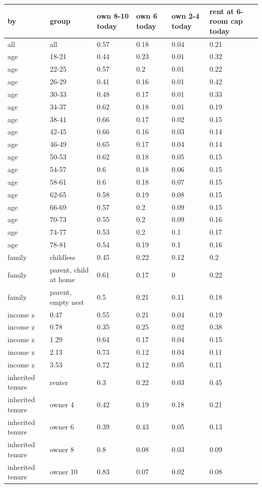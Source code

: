 \begingroup\small
\setlength{\tabcolsep}{3pt}
\renewcommand{\arraystretch}{1.04}
\begin{tabularx}{\linewidth}{XXXXXX}
\toprule
by & group & own 8-10 today & own 6 today & own 2-4 today & rent at 6-room cap today \\
\midrule
all & all & 0.57 & 0.18 & 0.04 & 0.21 \\
age & 18-21 & 0.44 & 0.23 & 0.01 & 0.32 \\
age & 22-25 & 0.57 & 0.2 & 0.01 & 0.22 \\
age & 26-29 & 0.41 & 0.16 & 0.01 & 0.42 \\
age & 30-33 & 0.48 & 0.17 & 0.01 & 0.33 \\
age & 34-37 & 0.62 & 0.18 & 0.01 & 0.19 \\
age & 38-41 & 0.66 & 0.17 & 0.02 & 0.15 \\
age & 42-45 & 0.66 & 0.16 & 0.03 & 0.14 \\
age & 46-49 & 0.65 & 0.17 & 0.04 & 0.14 \\
age & 50-53 & 0.62 & 0.18 & 0.05 & 0.15 \\
age & 54-57 & 0.6 & 0.18 & 0.06 & 0.15 \\
age & 58-61 & 0.6 & 0.18 & 0.07 & 0.15 \\
age & 62-65 & 0.58 & 0.19 & 0.08 & 0.15 \\
age & 66-69 & 0.57 & 0.2 & 0.09 & 0.15 \\
age & 70-73 & 0.55 & 0.2 & 0.09 & 0.16 \\
age & 74-77 & 0.53 & 0.2 & 0.1 & 0.17 \\
age & 78-81 & 0.54 & 0.19 & 0.1 & 0.16 \\
family & childless & 0.45 & 0.22 & 0.12 & 0.2 \\
family & parent, child at home & 0.61 & 0.17 & 0 & 0.22 \\
family & parent, empty nest & 0.5 & 0.21 & 0.11 & 0.18 \\
income z & 0.47 & 0.55 & 0.21 & 0.04 & 0.19 \\
income z & 0.78 & 0.35 & 0.25 & 0.02 & 0.38 \\
income z & 1.29 & 0.64 & 0.17 & 0.04 & 0.15 \\
income z & 2.13 & 0.73 & 0.12 & 0.04 & 0.11 \\
income z & 3.53 & 0.72 & 0.12 & 0.05 & 0.11 \\
inherited tenure & renter & 0.3 & 0.22 & 0.03 & 0.45 \\
inherited tenure & owner 4 & 0.42 & 0.19 & 0.18 & 0.21 \\
inherited tenure & owner 6 & 0.39 & 0.43 & 0.05 & 0.13 \\
inherited tenure & owner 8 & 0.8 & 0.08 & 0.03 & 0.09 \\
inherited tenure & owner 10 & 0.83 & 0.07 & 0.02 & 0.08 \\
\bottomrule
\end{tabularx}
\endgroup
